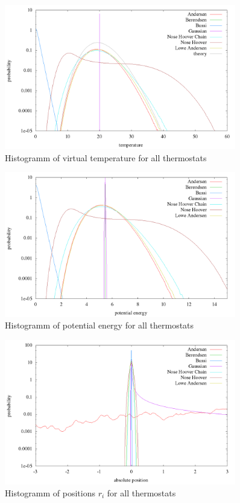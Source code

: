 \begin{figure}[H]
\centering
\includegraphics[width=0.9\textwidth]{./graphics/Histogramm_tempCol_rand_T=20_p=64.png}
\caption{Histogramm of virtual temperature for all thermostats}
\label{im:temp_rand}
\end{figure}

\begin{figure}[H]
\centering
\includegraphics[width=0.9\textwidth]{./graphics/Histogramm_epot_rand_T=20_p=64.png}
\caption{Histogramm of potential energy for all thermostats}
\label{im:epot_rand}
\end{figure}

\begin{figure}[H]
\centering
\includegraphics[width=0.9\textwidth]{./graphics/Histogramm_absPosition_rand_T=20_p=64.png}
\caption{Histogramm of positions $r_i$ for all thermostats}
\label{im:absPos_rand}
\end{figure} 

